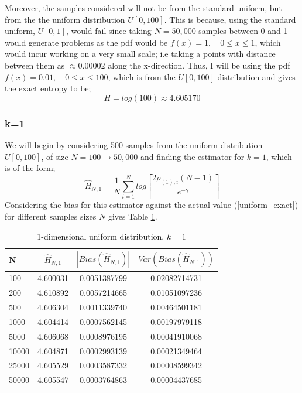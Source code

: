 \documentclass{article}
\begin{document}
Moreover, the samples considered will not be from the standard uniform, but from the the uniform distribution $U[0,100]$. This is because, using the standard uniform, $U[0,1]$, would fail since taking $N=50,000$ samples between 0 and 1 would generate problems as the pdf would be $f(x) = 1 , \quad 0 \leq x \leq 1$, which would incur working on a very small scale; i.e taking a points with distance between them as $\approx 0.00002$ along the x-direction. Thus, I will be using the pdf $f(x) = 0.01 , \quad 0 \leq x \leq 100$, which is from the $U[0,100]$ distribution and gives the exact entropy to be;
\begin{equation} \label{uniform_exact}
H = log(100) \approx 4.605170
\end{equation}




\subsubsection{k=1} \label{U_k=1}
We will begin by considering 500 samples from the uniform distribution $U[0,100]$, of size $N=100 \to 50,000$ and finding the estimator for $k=1$, which is of the form;
\begin{equation} 
\hat{H}_{N, 1} = \frac{1}{N} \sum_{i=1}^{N} log \left[ \frac{2\rho_{(1),i} (N-1)}{e^{-\gamma}} \right] \nonumber
\end{equation}
Considering the bias for this estimator against the actual value (\ref{uniform_exact}) for different samples sizes $N$ gives Table \ref{uniform_k=1_table}.

\begin{table}
\caption{1-dimensional uniform distribution, $k=1$} \label{uniform_k=1_table}
\begin{center}
\begin{tabular}{| l | c c c|} 
\toprule
N & $\hat{H}_{N, 1}$ & $|Bias(\hat{H}_{N, 1})|$ & $Var(Bias(\hat{H}_{N, 1}))$ \\
\midrule[1pt]
100     & 4.600031     & 0.0051387799     & 0.02082714731  \\
200     & 4.610892     & 0.0057214665     & 0.01051097236  \\
500     & 4.606304     & 0.0011339740     & 0.00464501181  \\
1000    & 4.604414     & 0.0007562145     & 0.00197979118  \\
5000    & 4.606068     & 0.0008976195     & 0.00041910068  \\
10000   & 4.604871     & 0.0002993139     & 0.00021349464  \\
25000   & 4.605529     & 0.0003587332     & 0.00008599342  \\
50000   & 4.605547     & 0.0003764863     & 0.00004437685  \\
\hline
\end{tabular}
\end{center}
\end{table}
\end{document}
